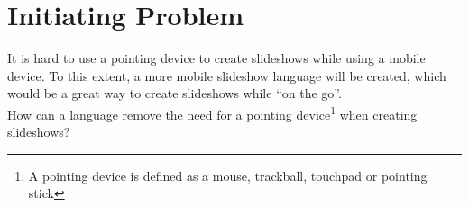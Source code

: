 \section{Initiating Problem}
It is hard to use a pointing device to create slideshows while using a mobile device. To this extent, a more mobile slideshow language will be created, which would be a great way to create slideshows while ``on the go''. \\
How can a language remove the need for a pointing device\footnote{A pointing device is defined as a mouse, trackball, touchpad or pointing stick} when creating slideshows?